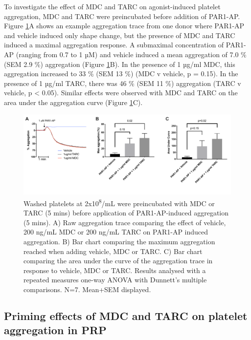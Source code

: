 \documentclass[11pt,twoside]{bristolthesis}
\begin{document}
To investigate the effect of MDC and TARC on agonist-induced platelet aggregation, MDC and TARC were preincubated before addition of PAR1-AP. Figure \ref{fig:MDC-TARC-agg}A shows an example aggregation trace from one donor where PAR1-AP and vehicle induced only shape change, but the presence of MDC and TARC induced a maximal aggregation response. A submaximal concentration of PAR1-AP (ranging from 0.7 to 1 µM) and vehicle induced a mean aggregation of 7.0 \% (SEM 2.9 \%) aggregation (Figure \ref{fig:MDC-TARC-agg}B). In the presence of 1 µg/ml MDC, this aggregation increased to 33 \% (SEM 13 \%) (MDC v vehicle, p = 0.15). In the presence of 1 µg/ml TARC, there was 46 \% (SEM 11 \%) aggregation (TARC v vehicle, p \textless{} 0.05). Similar effects were observed with MDC and TARC on the area under the aggregation curve (Figure \ref{fig:MDC-TARC-agg}C).



\begin{figure}
\includegraphics[width=0.8\linewidth]{figure/Chemokines/Layouts/MDC_TARC_aggregation_PAR1} \caption[The priming effect of the chemokines MDC and TARC on PAR1-AP induced platelet aggregation in washed platelets]{Washed platelets at 2x10\textsuperscript{8}/mL were preincubated with MDC or TARC (5 mins) before application of PAR1-AP-induced aggregation (5 mins). A) Raw aggregation trace comparing the effect of vehicle, 200 ng/mL MDC or 200 ng/mL TARC on PAR1-AP induced aggregation. B) Bar chart comparing the maximum aggregation reached when adding vehicle, MDC or TARC. C) Bar chart comparing the area under the curve of the aggregation trace in response to vehicle, MDC or TARC. Results analysed with a repeated measures one-way ANOVA with Dunnett's multiple comparisons. N=7. Mean+SEM displayed.}\label{fig:MDC-TARC-agg}
\end{figure}
\hypertarget{priming-effects-of-mdc-and-tarc-on-platelet-aggregation-in-prp}{%
\subsection{Priming effects of MDC and TARC on platelet aggregation in PRP}\label{priming-effects-of-mdc-and-tarc-on-platelet-aggregation-in-prp}}
\end{document}
